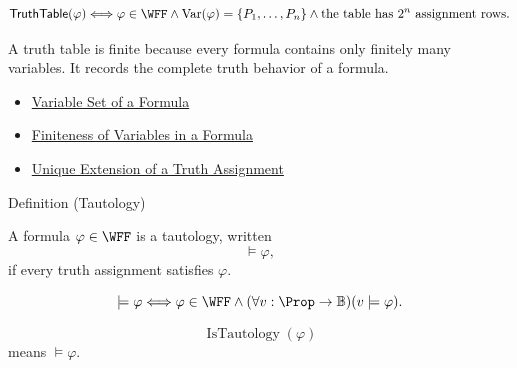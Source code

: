 \begin{remark*}
\[
\mathsf{TruthTable}(\varphi)
\Longleftrightarrow
\varphi\in\WFF
\land
\operatorname{Var}(\varphi)=\{P_1,\ldots,P_n\}
\land
\text{the table has }2^n\text{ assignment rows}.
\]
\end{remark*}

\begin{remark*}[Interpretation]
A truth table is finite because every formula contains only finitely many variables. It records the complete truth behavior of a formula.
\end{remark*}

\begin{dependencies}
\begin{itemize}
  \item \hyperref[def:formula-variable-set-propositional-logic]{Variable Set of a Formula}
  \item \hyperref[lem:finiteness-of-variables-propositional-formulas]{Finiteness of Variables in a Formula}
  \item \hyperref[thm:unique-extension-truth-assignment-propositional-logic]{Unique Extension of a Truth Assignment}
\end{itemize}
\end{dependencies}
\begin{definitionbox}{Definition (Tautology)}
\begin{definition}[Tautology]
\label{def:tautology-propositional-logic}
A formula \(\varphi\in\WFF\) is a tautology, written
\[
\models\varphi,
\]
if every truth assignment satisfies \(\varphi\).
\end{definition}
\end{definitionbox}

\begin{remark*}
\[
\models\varphi
\Longleftrightarrow
\varphi\in\WFF
\land
(\forall v:\Prop\to\mathbb{B})(v\models\varphi).
\]
\end{remark*}

\begin{remark*}
\[
\operatorname{IsTautology}(\varphi)
\]
means \(\models\varphi\).
\end{remark*}

